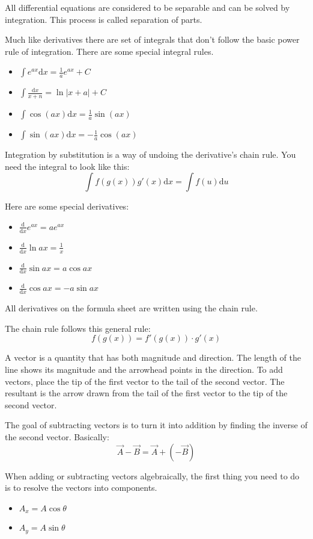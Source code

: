 \documentclass[../em.tex]{subfiles}
\begin{document}
All differential equations are considered to be separable and can be solved by integration. This process is called separation of parts.

Much like derivatives there are set of integrals that don't follow the basic power rule of integration. There are some special integral rules.
\begin{itemize}
    \item $\int{e^{ax}}\mathrm{d}x=\frac{1}{a}e^{ax}+C$
    \item $\int \frac{\mathrm{d}x}{x+n}=\ln |x+a|+C$
    \item $\int \cos(ax)\mathrm{d}x = \frac{1}{a}\sin(ax)$
    \item $\int \sin(ax)\mathrm{d}x=-\frac{1}{a}\cos(ax)$
\end{itemize}

Integration by substitution is a way of undoing the derivative's chain rule. You need the integral to look like this:
\[\int f(g(x))g'(x)\mathrm{d}x=\int f(u)\mathrm{d}u\]

Here are some special derivatives:
\begin{itemize}
    \item $\frac{\mathrm{d}}{\mathrm{d}x}e^{ax}=ae^{ax}$
    \item $\frac{\mathrm{d}}{\mathrm{d}x}\ln ax = \frac{1}{x}$
    \item $\frac{\mathrm{d}}{\mathrm{d}x}\sin ax = a\cos ax$
    \item $\frac{\mathrm{d}}{\mathrm{d}x}\cos ax = -a\sin ax$
\end{itemize}

All derivatives on the formula sheet are written using the chain rule.

The chain rule follows this general rule: 
\[f(g(x))=f'(g(x))\cdot g'(x)\]

A vector is a quantity that has both magnitude and direction. The length of the line shows its 
magnitude and the arrowhead points in the direction.
To add vectors, place the tip of the first vector to the tail of the second vector.
The resultant is the arrow drawn from the tail of the first vector to the tip of the second vector.

The goal of subtracting vectors is to turn it into addition by finding the inverse of the second vector. Basically: 
\[\vec{A}-\vec{B}=\vec{A}+(-\vec{B})\]

When adding or subtracting vectors algebraically, the first thing you need to do is to resolve the vectors into components.
\begin{itemize}
    \item $A_x = A\cos \theta$
    \item $A_y = A\sin \theta$
\end{itemize}
\end{document}
